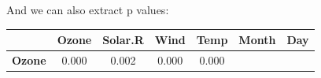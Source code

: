 \documentclass[]{article}
\newenvironment{Shaded}{\begin{snugshade}}{\end{snugshade}}
\newcommand{\KeywordTok}[1]{\textcolor[rgb]{0.13,0.29,0.53}{\textbf{#1}}}
\newcommand{\StringTok}[1]{\textcolor[rgb]{0.31,0.60,0.02}{#1}}
\newcommand{\OperatorTok}[1]{\textcolor[rgb]{0.81,0.36,0.00}{\textbf{#1}}}
\newcommand{\NormalTok}[1]{#1}
\theoremstyle{definition}
\theoremstyle{definition}
\theoremstyle{definition}
\theoremstyle{remark}
\begin{document}
And we can also extract p values:

\begin{Shaded}
\end{Shaded}

\begin{longtable}[]{@{}ccccccc@{}}
\toprule
\begin{minipage}[b]{0.16\columnwidth}\centering\strut
~\strut
\end{minipage} & \begin{minipage}[b]{0.09\columnwidth}\centering\strut
Ozone\strut
\end{minipage} & \begin{minipage}[b]{0.11\columnwidth}\centering\strut
Solar.R\strut
\end{minipage} & \begin{minipage}[b]{0.09\columnwidth}\centering\strut
Wind\strut
\end{minipage} & \begin{minipage}[b]{0.09\columnwidth}\centering\strut
Temp\strut
\end{minipage} & \begin{minipage}[b]{0.09\columnwidth}\centering\strut
Month\strut
\end{minipage} & \begin{minipage}[b]{0.09\columnwidth}\centering\strut
Day\strut
\end{minipage}\tabularnewline
\midrule
\endhead
\begin{minipage}[t]{0.16\columnwidth}\centering\strut
\textbf{Ozone}\strut
\end{minipage} & \begin{minipage}[t]{0.09\columnwidth}\centering\strut
0.000\strut
\end{minipage} & \begin{minipage}[t]{0.11\columnwidth}\centering\strut
0.002\strut
\end{minipage} & \begin{minipage}[t]{0.09\columnwidth}\centering\strut
0.000\strut
\end{minipage} & \begin{minipage}[t]{0.09\columnwidth}\centering\strut
0.000\strut
\end{minipage} & \begin{minipage}[t]{0.09\columnwidth}\centering\strut

\end{minipage}
\end{longtable}
\end{document}
